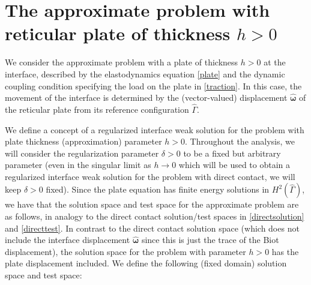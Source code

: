 \documentclass[11pt]{article}
\newcommand{\bd}{\boldsymbol}
\theoremstyle{definition}
\begin{document}
\section{The approximate problem with reticular plate of thickness $h > 0$}\label{hproof}

We consider the approximate problem with a plate of thickness $h > 0$ at the interface, described by the elastodynamics equation \eqref{plate} and the dynamic coupling condition specifying the load on the plate in \eqref{traction}. In this case, the movement of the interface is determined by the (vector-valued) displacement $\hat{\bd{\omega}}$ of the reticular plate from its reference configuration $\hat{\Gamma}$. 

We define a concept of a regularized interface weak solution for the problem with plate thickness (approximation) parameter $h > 0$. Throughout the analysis, we will consider the regularization parameter $\delta > 0$ to be a fixed but arbitrary parameter (even in the singular limit as $h \to 0$ which will be used to obtain a regularized interface weak solution for the problem with direct contact, we will keep $\delta > 0$ fixed). Since the plate equation has finite energy solutions in $H^{2}(\hat{\Gamma})$, we have that the solution space and test space for the approximate problem are as follows, in analogy to the direct contact solution/test spaces in \eqref{directsolution} and \eqref{directtest}. In contrast to the direct contact solution space (which does not include the interface displacement $\hat{\bd{\omega}}$ since this is just the trace of the Biot displacement), the solution space for the problem with parameter $h > 0$ has the plate displacement included. We define the following (fixed domain) solution space and test space:
\end{document}
